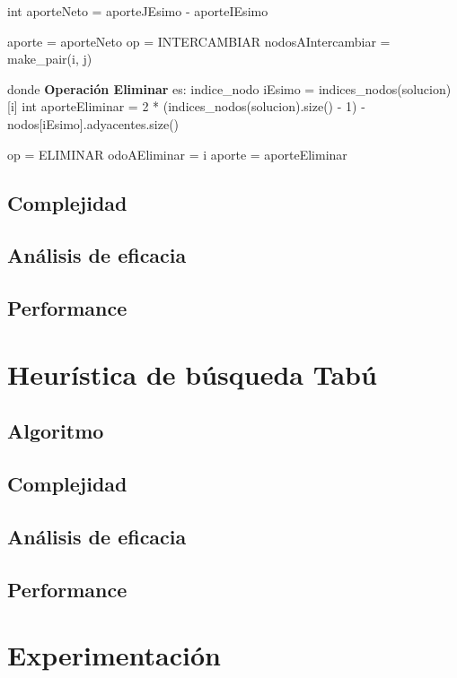 \documentclass[a4paper, 10pt, twoside]{article}
\newenvironment{pseudo}[1][]{%
    \vspace{1em}%
    \begin{algorithmic}%
}
{%
    \end{algorithmic}%
    \vspace{1em}%
}
\begin{document}
\begin{pseudo}
					\State int aporteNeto = aporteJEsimo - aporteIEsimo

						\State aporte = aporteNeto
						\State op = INTERCAMBIAR
						\State nodosAIntercambiar = make\_pair(i, j)
					\EndIf
				\EndIf
			\EndFor		

\State
\State donde \textbf{Operación Eliminar} es:
\State
			\State indice\_nodo iEsimo = indices\_nodos(solucion)[i]
			\State int aporteEliminar = 2 * (indices\_nodos(solucion).size() - 1) - nodos[iEsimo].adyacentes.size()

				\State op = ELIMINAR
				\State odoAEliminar = i
				\State aporte = aporteEliminar
			\EndIf
		\EndFor


\end{pseudo}

\subsection{Complejidad}
\subsection{Análisis de eficacia}
\subsection{Performance}



\newpage

\section{Heurística de búsqueda Tabú}
\subsection{Algoritmo}
\subsection{Complejidad}
\subsection{Análisis de eficacia}
\subsection{Performance}



\newpage

\section{Experimentación}
\end{document}
